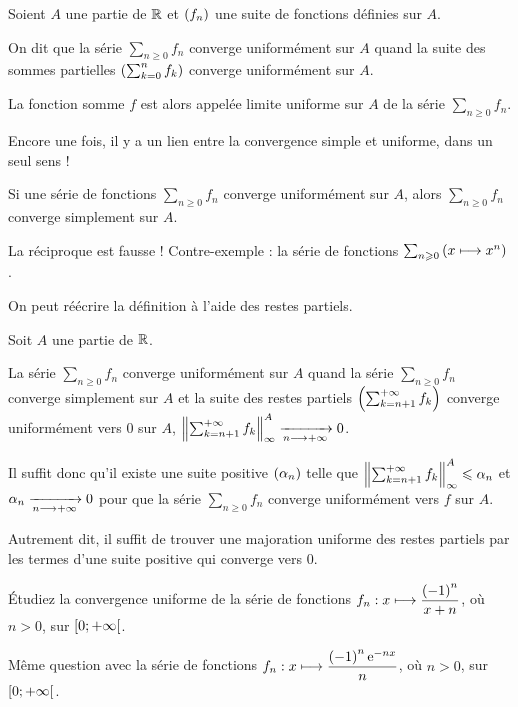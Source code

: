 \begin{defi}
Soient \(A\) une partie de \(\mathbb{R}\) et \(\left(f_n\right)\) une suite de fonctions définies sur \(A\).

On dit que la série \(\sum_{n\geq0}f_n\) converge uniformément sur \(A\) quand la suite des sommes partielles \(\left(\sum_{k=0}^nf_k\right)\) converge uniformément sur \(A\).

La fonction somme \(f\) est alors appelée limite uniforme sur \(A\) de la série \(\sum_{n\geq0}f_n\).
\end{defi}

Encore une fois, il y a un lien entre la convergence simple et uniforme, dans un seul sens !

\begin{theo}
Si une série de fonctions \(\sum_{n\geq0}f_n\) converge uniformément sur \(A\), alors \(\sum_{n\geq0}f_n\) converge simplement sur \(A\).
\end{theo}

La réciproque est fausse ! Contre-exemple : la série de fonctions \(\sum_{n\geqslant0}\left(x\longmapsto x^n\right)\).

On peut réécrire la définition à l'aide des restes partiels.

\begin{prop}
Soit \(A\) une partie de \(\mathbb{R}\).

La série \(\sum_{n\geq0}f_n\) converge uniformément sur \(A\) quand la série \(\sum_{n\geq0}f_n\) converge simplement sur \(A\) et la suite des restes partiels \(\left(\sum_{k=n+1}^{+\infty}f_k\right)\) converge uniformément vers \(0\) sur \(A\), \ie \(\norme{\sum_{k=n+1}^{\pinf}f_k}_\infty^A\tendqd{n\to\pinf}0\).
\end{prop}

Il suffit donc qu'il existe une suite positive \(\left(\alpha_n\right)\) telle que \(\norme{\sum_{k=n+1}^{\pinf}f_k}_\infty^A\leq\alpha_n\) et \(\alpha_n\xrightarrow[n\longrightarrow+\infty]{}0\) pour que la série \(\sum_{n\geq0}f_n\) converge uniformément vers \(f\) sur \(A\).

Autrement dit, il suffit de trouver une majoration uniforme des restes partiels par les termes d'une suite positive qui converge vers \(0\).

\begin{exo}
Étudiez la convergence uniforme de la série de fonctions \(f_n:x\longmapsto\dfrac{\left(-1\right)^n}{x+n}\), où \(n>0\), sur \(\left[0;+\infty\right[\).
\end{exo}

\begin{exo}
Même question avec la série de fonctions \(f_n:x\longmapsto\dfrac{\left(-1\right)^n\mathrm{e}^{-nx}}{n}\), où \(n>0\), sur \(\left[0;+\infty\right[\).
\end{exo}

